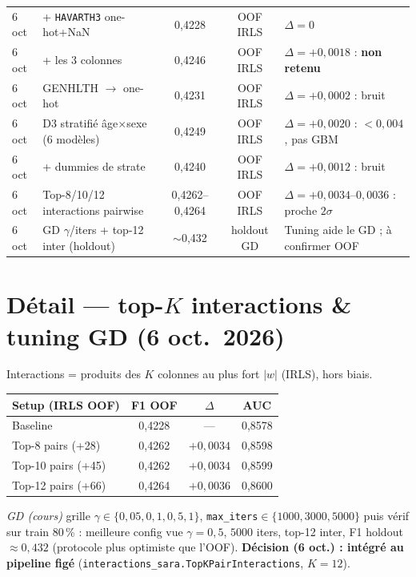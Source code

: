 \documentclass[11pt,a4paper]{article}
\begin{document}
\begin{longtable}{@{}p{2.4cm}p{5.0cm}ccp{3.8cm}@{}}
6 oct & + \texttt{HAVARTH3} one-hot+NaN & 0{,}4228 & OOF IRLS & $\Delta=0$ \\
6 oct & + les 3 colonnes & 0{,}4246 & OOF IRLS & $\Delta=+0{,}0018$ : \textbf{non retenu} \\
6 oct & GENHLTH $\to$ one-hot & 0{,}4231 & OOF IRLS & $\Delta=+0{,}0002$ : bruit \\
6 oct & D3 stratifié âge$\times$sexe (6 modèles) & 0{,}4249 & OOF IRLS & $\Delta=+0{,}0020$ : $<0{,}004$, pas GBM \\
6 oct & + dummies de strate & 0{,}4240 & OOF IRLS & $\Delta=+0{,}0012$ : bruit \\
6 oct & Top-8/10/12 interactions pairwise & 0{,}4262--0{,}4264 & OOF IRLS & $\Delta=+0{,}0034$--$0{,}0036$ : proche $2\sigma$ \\
6 oct & GD $\gamma$/iters + top-12 inter (holdout) & $\sim$0{,}432 & holdout GD & Tuning aide le GD ; à confirmer OOF \\
\bottomrule
\end{longtable}

\section{Détail --- top-$K$ interactions \& tuning GD (6 oct.\ 2026)}
Interactions = produits des $K$ colonnes au plus fort $|w|$ (IRLS), hors biais.

\begin{center}
\begin{tabular}{@{}lccc@{}}
\toprule
Setup (IRLS OOF) & F1 OOF & $\Delta$ & AUC \\
\midrule
Baseline & 0{,}4228 & --- & 0{,}8578 \\
Top-8 pairs (+28) & 0{,}4262 & $+0{,}0034$ & 0{,}8598 \\
Top-10 pairs (+45) & 0{,}4262 & $+0{,}0034$ & 0{,}8599 \\
Top-12 pairs (+66) & 0{,}4264 & $+0{,}0036$ & 0{,}8600 \\
\bottomrule
\end{tabular}
\end{center}

\noindent\textit{GD (cours)} grille $\gamma\in\{0{,}05,0{,}1,0{,}5,1\}$,
\texttt{max\_iters}$\in\{1000,3000,5000\}$ puis vérif sur train 80\,\% :
meilleure config vue $\gamma=0{,}5$, $5000$ iters, top-12 inter,
F1 holdout $\approx 0{,}432$ (protocole plus optimiste que l'OOF).
\textbf{Décision (6 oct.) : intégré au pipeline figé}
(\texttt{interactions\_sara.TopKPairInteractions}, $K=12$).
\end{document}
